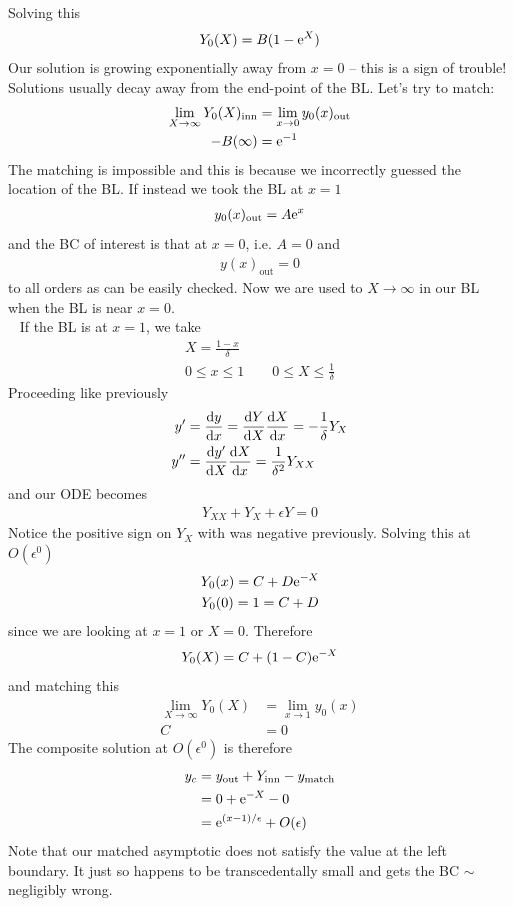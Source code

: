 Solving this
\begin{gather*}
	Y_0(X) = B(1 - \mathrm{e}^{X})
\end{gather*}
Our solution is growing exponentially away from $x = 0$ -- this is a sign of trouble! Solutions usually decay away from the end-point of the BL. Let's try to match:
\begin{align*}
	\lim\limits_{X \rightarrow \infty} Y_0(X)_\text{inn} &= \lim\limits_{x \rightarrow 0} y_0(x)_\text{out} \\
	-B(\infty)&= \mathrm{e}^{-1}
\end{align*}
The matching is impossible and this is because we incorrectly guessed the location of the BL. If instead we took the BL at $x=1$
\begin{gather*}
	y_0(x)_\text{out} = A\mathrm{e}^x
\end{gather*}
and the BC of interest is that at $x=0$, i.e. $A=0$ and
\begin{gather*}
	y(x)_\text{out} = 0
\end{gather*}
to all orders as can be easily checked. Now we are used to $X \rightarrow \infty$ in our BL when the BL is near $x=0$. \\
\ \newline 
If the BL is at $x=1$, we take
\begin{gather*}
	X = \frac{1-x}{\delta} \\
	0 \leq x \leq 1 \qquad 0 \leq X \leq \frac{1}{\delta}
\end{gather*}
Proceeding like previously
\begin{align*}
y' &= \frac{\mathrm{d} y}{\mathrm{d} x} = \frac{\mathrm{d} Y}{\mathrm{d} X} \frac{\mathrm{d} X}{\mathrm{d} x} = -\frac{1}{\delta} Y_X \\
y'' &= \frac{\mathrm{d} y'}{\mathrm{d} X} \frac{\mathrm{d} X}{\mathrm{d} x} = \frac{1}{\delta^2} Y_{XX}
\end{align*}
and our ODE becomes
\begin{gather*}
	Y_{XX} + Y_X + \epsilon Y = 0
\end{gather*}
Notice the positive sign on $Y_X$ with was negative previously. Solving this at $O(\epsilon^0)$
\begin{gather*}
	Y_0(x) = C + D\mathrm{e}^{-X} \\
	Y_0(0) = 1 = C+D
\end{gather*}
since we are looking at $x=1$ or $X=0$. Therefore
\begin{gather*}
	Y_0(X) = C + (1-C)\mathrm{e}^{-X}
\end{gather*}
and matching this
\begin{align*}
	\lim\limits_{X \rightarrow \infty} Y_0(X) &= \lim\limits_{x \rightarrow 1} y_0(x) \\
	C&= 0
\end{align*}
The composite solution at $O(\epsilon^0)$ is therefore
\begin{align*}
	y_c &= y_\text{out} + Y_\text{inn} - y_\text{match} \\
	&= 0 + \mathrm{e}^{-X} - 0 \\
	&= \mathrm{e}^{(x-1)/\epsilon} + O(\epsilon)
\end{align*}
Note that our matched asymptotic does not satisfy the value at the left boundary. It just so happens to be transcedentally small and gets the BC $\sim$negligibly wrong. 


